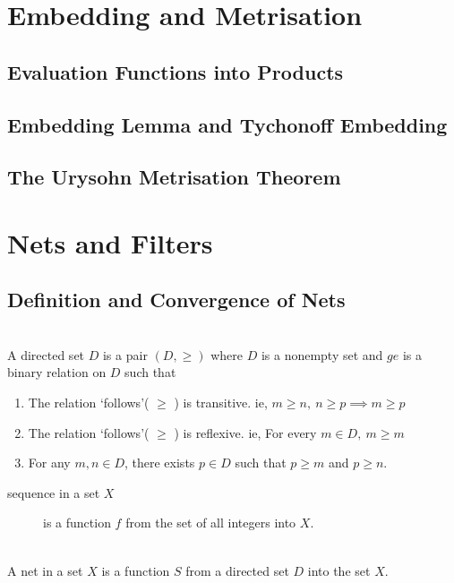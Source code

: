\chapter{Embedding and Metrisation}
\section{Evaluation Functions into Products}
\section{Embedding Lemma and Tychonoff Embedding}
\section{The Urysohn Metrisation Theorem}

\chapter{Nets and Filters}
\section{Definition and Convergence of Nets}
\begin{definition}\cite[10.1.1]{joshi}\\
	A directed set \(D\) is a pair \( (D,\ge) \) where \( D \) is a nonempty set and  \( ge \) is a binary relation on \( D \) such that
	\begin{enumerate}%
		\item The relation `follows'( \( \ge \) ) is transitive. ie,  \( m \ge n,\ n \ge p \implies m \ge p \)
		\item The relation `follows'( \( \ge \) ) is reflexive. ie, For every \( m \in D,\ m \ge m \)
		\item For any \( m,n \in D \), there exists \( p \in D \) such that \( p \ge m \) and \( p \ge n \).
	\end{enumerate}
\end{definition}

\begin{description}
	\item[sequence in a set \( X \)] is a function \( f \) from the set of all integers into \( X \).
\end{description}

\begin{definition}[Net]\cite[10.1.2]{joshi}\\
	A net in a set \( X \) is a function \( S \) from a directed set \( D \) into the set \( X \).
\end{definition}

